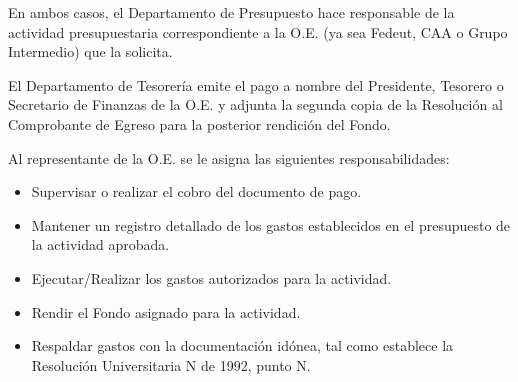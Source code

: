 En ambos casos, el Departamento de Presupuesto hace responsable de la actividad presupuestaria correspondiente a la O.E. (ya sea Fedeut, CAA o Grupo Intermedio) que la solicita.

El Departamento de Tesorería emite el pago a nombre del Presidente, Tesorero o Secretario de Finanzas de la O.E. y adjunta la segunda copia de la Resolución al Comprobante de Egreso para la posterior rendición del Fondo.

Al representante de la O.E. se le asigna las siguientes responsabilidades:

\begin{itemize}
    \item Supervisar o realizar el cobro del documento de pago.
    \item Mantener un registro detallado de los gastos establecidos en el presupuesto de la actividad aprobada.
    \item Ejecutar/Realizar los gastos autorizados para la actividad.
    \item Rendir el Fondo asignado para la actividad.
    \item Respaldar gastos con la documentación idónea, tal como establece la Resolución Universitaria N de 1992, punto N. 
\end{itemize} 